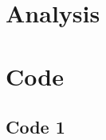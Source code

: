 \documentclass[]{book}
\begin{document}
\mainmatter





\chapter{Analysis}









\pagebreak

\appendix


\chapter{Code}
\section{Code 1}
\end{document}
